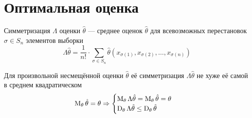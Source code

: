 \section{Оптимальная оценка}
\begin{definition}[Симметризация]
  Симметризация $\Lambda$ оценки $\hat{\theta}$ --- среднее
  оценок $\hat{\theta}$ для
  всевозможных перестановок $\sigma\in S_n$
  элементов выборки \xsample
  $$\Lambda\hat{\theta}
      =\frac{1}{n!}\cdot\sum_{\sigma\in S_n} \hat{\theta}\left(
      x_{\sigma\left(1\right)}, x_{\sigma\left(2\right)},
          \dots, x_{\sigma\left(n\right)}\right)$$
\end{definition}
\begin{lemma}
  Для произвольной несмещённой оценки $\hat{\theta}$
  её симметризация $\Lambda{\hat{\theta}}$
  не хуже её самой в среднем квадратическом
  \begin{align*}
  \operatorname{M}_{\theta} \hat{\theta}
      =\theta
  \Rightarrow
      \begin{cases}
      \operatorname{M}_{\theta} \Lambda{\hat{\theta}}
          =\operatorname{M}_{\theta} \hat{\theta}
          =\theta\\
      \operatorname{D}_{\theta} \Lambda{\hat{\theta}}
          \le\operatorname{D}_{\theta} \hat{\theta}
      \end{cases}
  \end{align*}
\end{lemma}

